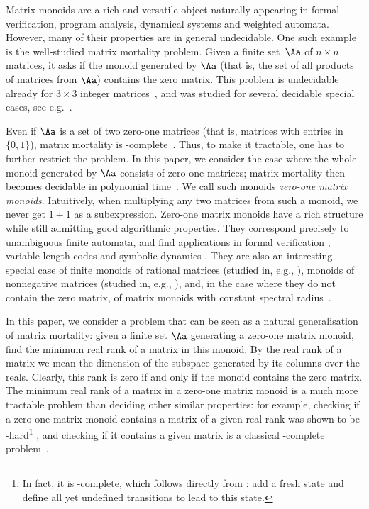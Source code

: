 Matrix monoids are a rich and versatile object naturally appearing in formal verification, program analysis, dynamical systems and weighted automata. 
However, many of their properties are in general undecidable. One such example is the well-studied matrix mortality problem. Given a finite set~$\Aa$ of $n \times n$ matrices, it asks if the monoid generated by $\Aa$ (that is, the set of all products of matrices from $\Aa$) contains the zero matrix. This problem is undecidable already for $3 \times 3$ integer matrices~\cite{Paterson1970}, and was studied for several decidable special cases, see e.g.~\cite{Cassaigne2014,Bell2021,Ryzhikov2024RP}.

Even if $\Aa$ is a set of two zero-one matrices (that is, matrices with entries in~$\{0, 1\}$), matrix mortality is \PSPACE-complete~\cite{Ryzhikov2024RP}. Thus, to make it tractable, one has to further restrict the problem. In this paper, we consider the case where the whole monoid generated by $\Aa$ consists of zero-one matrices;  matrix mortality then becomes decidable in polynomial time~\cite{Kiefer2021}. We call such monoids \emph{zero-one matrix monoids}. Intuitively, when multiplying any two matrices from such a monoid, we never get $1 + 1$ as a subexpression. Zero-one matrix monoids have a rich structure while still admitting good algorithmic properties. They correspond precisely to unambiguous finite automata, and find applications in formal verification \cite{Baier2023}, variable-length codes \cite{Berstel2010} and symbolic dynamics \cite{Lind2021}.
They are also an interesting special case of finite monoids of rational matrices (studied in, e.g., \cite{Mandel1977,Jacob1977,Almeida2009,Bumpus2020}), monoids of nonnegative matrices (studied in, e.g., \cite{Protasov2021,Blondel2015,Wu2023,Gerencser2018}), and, in the case where they do not contain the zero matrix, of matrix monoids with constant spectral radius~\cite{Protasov2017}.

In this paper, we consider a problem that can be seen as a natural generalisation of matrix mortality: given a finite set $\Aa$ generating a zero-one matrix monoid, find the minimum real rank of a matrix in this monoid. By the real rank of a matrix we mean the dimension of the subspace generated by its columns over the reals. Clearly, this rank is zero if and only if the monoid contains the zero matrix. 
The minimum real rank of a matrix in a zero-one matrix monoid is a much more tractable problem than deciding other similar properties: for example,  checking if a zero-one matrix monoid contains a matrix of a given real rank was shown to be \NP-hard\footnote{In fact, it is \PSPACE-complete, which follows directly from \cite[Theorem~3]{Berlinkov2014}: add a fresh state and define all yet undefined transitions to lead to this state.} \cite{GORALCIK1995}, and checking if it contains a given matrix is a classical \PSPACE-complete problem~\cite{Kozen1977}.

